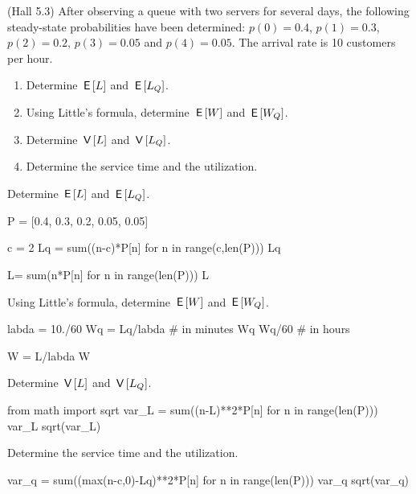 \begin{exercise}(Hall 5.3) After observing a queue with two servers
  for several days, the following steady-state probabilities have been
  determined: $p(0)=0.4$, $p(1) = 0.3$, $p(2)=0.2$, $p(3)=0.05$ and
  $p(4)=0.05$. The arrival rate is 10 customers per hour.
  \begin{enumerate}
  \item Determine $\,\mathsf{E}\left[L\right]$ and  $\,\mathsf{E}\left[L_Q\right]$. 
  \item Using Little's formula, determine $\,\mathsf{E}\left[W\right]$ and $\,\mathsf{E}\left[W_Q\right]$. 
  \item Determine $\,\mathsf{V}\left[L\right]$ and $\,\mathsf{V}\left[L_Q\right]$.
  \item Determine the service time and the utilization.
  \end{enumerate}
  \begin{solution}
 Determine $\,\mathsf{E}\left[L\right]$ and  $\,\mathsf{E}\left[L_Q\right]$. 

\begin{pyconsole}
P = [0.4, 0.3, 0.2, 0.05, 0.05]

c = 2
Lq = sum((n-c)*P[n] for n in range(c,len(P)))
Lq

L= sum(n*P[n] for n in range(len(P)))
L
\end{pyconsole}

 Using Little's formula, determine $\,\mathsf{E}\left[W\right]$ and $\,\mathsf{E}\left[W_Q\right]$. 
\begin{pyconsole}
labda = 10./60
Wq = Lq/labda # in minutes
Wq
Wq/60 # in hours

W = L/labda
W
\end{pyconsole} 

 Determine $\,\mathsf{V}\left[L\right]$ and $\,\mathsf{V}\left[L_Q\right]$.
\begin{pyconsole}
from math import sqrt
var_L = sum((n-L)**2*P[n] for n in range(len(P)))
var_L
sqrt(var_L)
\end{pyconsole} 

Determine the service time and the utilization.
\begin{pyconsole}
var_q = sum((max(n-c,0)-Lq)**2*P[n] for n in range(len(P)))
var_q
sqrt(var_q)
\end{pyconsole}
    \end{solution}
\end{exercise}  

